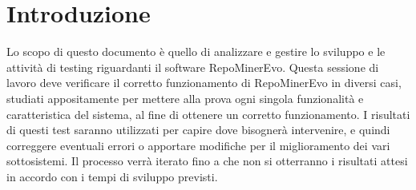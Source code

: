 \chapter{Introduzione}
Lo scopo di questo documento è quello di analizzare e gestire lo sviluppo e le attività di testing riguardanti il software RepoMinerEvo. Questa sessione di lavoro deve verificare il corretto funzionamento di RepoMinerEvo in diversi casi, studiati appositamente per mettere alla prova ogni singola funzionalità e caratteristica del sistema, al fine di ottenere un corretto funzionamento. I risultati di questi test saranno utilizzati per capire dove bisognerà intervenire, e quindi correggere eventuali errori o apportare modifiche per il miglioramento dei vari sottosistemi. Il processo verrà iterato fino a che non si otterranno i risultati attesi in accordo con i tempi di sviluppo previsti.
